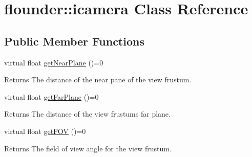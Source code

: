 \hypertarget{classflounder_1_1icamera}{}\section{flounder\+:\+:icamera Class Reference}
\label{classflounder_1_1icamera}
\subsection*{Public Member Functions}
\begin{DoxyCompactItemize}
\item 
\mbox{\label{classflounder_1_1icamera_a6595ce926a1d18c0df8c5a7b5665963d}} 
virtual float \hyperlink{classflounder_1_1icamera_a6595ce926a1d18c0df8c5a7b5665963d}{get\+Near\+Plane} ()=0
\begin{DoxyCompactList}\small\item\em \begin{DoxyReturn}{Returns}
The distance of the near pane of the view frustum. 
\end{DoxyReturn}
\end{DoxyCompactList}\item 
\mbox{\label{classflounder_1_1icamera_a682021a9ff1653ce4bf7288f94980633}} 
virtual float \hyperlink{classflounder_1_1icamera_a682021a9ff1653ce4bf7288f94980633}{get\+Far\+Plane} ()=0
\begin{DoxyCompactList}\small\item\em \begin{DoxyReturn}{Returns}
The distance of the view frustum\textquotesingle{}s far plane. 
\end{DoxyReturn}
\end{DoxyCompactList}\item 
\mbox{\label{classflounder_1_1icamera_a60d622d1c9731da45bf49255dea95122}} 
virtual float \hyperlink{classflounder_1_1icamera_a60d622d1c9731da45bf49255dea95122}{get\+F\+OV} ()=0
\begin{DoxyCompactList}\small\item\em \begin{DoxyReturn}{Returns}
The field of view angle for the view frustum. 
\end{DoxyReturn}
\end{DoxyCompactList}\item 

\end{DoxyCompactItemize}
